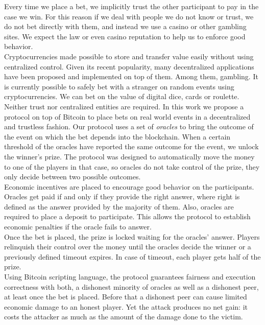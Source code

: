 Every time we place a bet, we implicitly trust the other participant  to pay in
  the case we win.
For this reason if we deal with people we do not know or trust, we do not bet
  directly with them, and instead we use a casino or other gambling sites.
We expect the law or even casino reputation to help us to enforce good
  behavior.\\
\noindent
Cryptocurrencies made possible to store and transfer value easily without
  using centralized control.
Given its recent popularity, many decentralized applications have been proposed
  and implemented on top of them.
Among them, gambling.
It is currently possible to safely bet with a stranger on random events
  using cryptocurrencies.
We can bet on the value of digital dice, cards or roulette.
Neither trust nor centralized entities are required.
In this work we propose a protocol on top of Bitcoin to place bets on real world
  events in a decentralized and trustless fashion.
\noindent
Our protocol uses a set of \textit{oracles} to bring the outcome of the event on which
  the bet depends into the blockchain.
When a certain threshold of the oracles have reported the same outcome for
  the event, we unlock the winner's prize.
The protocol was designed to automatically move the money to one of the players
  in that case, so oracles do not take control of the prize, they only decide
  between two possible outcomes.\\
\noindent
Economic incentives are placed to encourage good behavior on the participants.
Oracles get paid if and only if they provide the right answer, where right is
  defined as the answer provided by the majority of them.
Also, oracles are required to place a deposit to participate.
This allows the protocol to establish economic penalties if the oracle fails to
  answer.\\
\noindent
Once the bet is placed, the prize is locked waiting for the oracles' answer.
Players relinquish their control over the money until the oracles decide the
  winner or a previously defined timeout expires.
In case of timeout, each player gets half of the prize.\\
\noindent
Using Bitcoin scripting language, the protocol guarantees fairness and execution
  correctness with both, a dishonest minority of oracles as well as a dishonest
  peer, at least once the bet is placed.
Before that a dishonest peer can cause limited economic damage to an honest
  player.
Yet the attack produces no net gain: it costs the attacker as much as the amount
  of the damage done to the victim.
